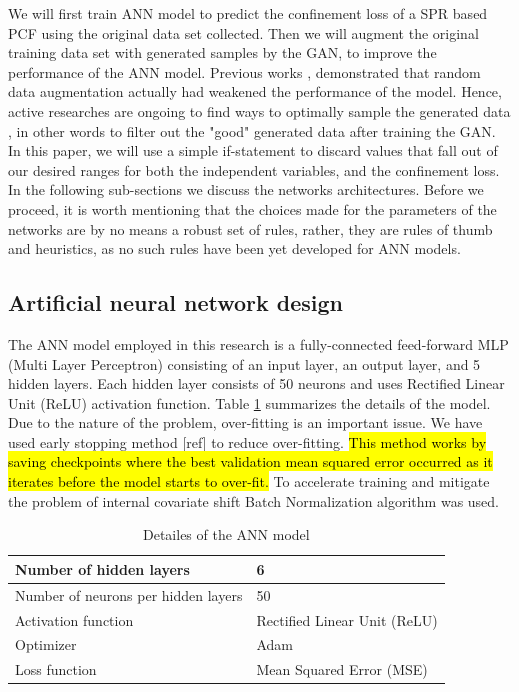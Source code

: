 \documentclass[draft, 10pt]{IEEEtran}
\begin{document}
We will first train ANN model to predict the confinement loss of a SPR based PCF using the original data set collected. Then we will augment the original training data set with generated samples by the GAN, to improve the performance of the ANN model.
Previous works \cite{ravuri2019seeing, shmelkov2018good}, demonstrated that random data augmentation actually had weakened the performance of the model. Hence, active researches are ongoing to find ways to optimally sample the generated data \cite{bhattarai2019sampling}, in other words to filter out the "good" generated data after training the GAN. In this paper, we will use a simple if-statement to discard values that fall out of our desired ranges for both the independent variables, and the confinement loss. In the following sub-sections we discuss the networks architectures. Before we proceed, it is worth mentioning that the choices made for the parameters of the networks are by no means a robust set of rules, rather, they are rules of thumb and heuristics, as no such rules have been yet developed for ANN models.

\subsection{Artificial neural network design}
\label{ssec:ann}
The ANN model employed in this research is a fully-connected feed-forward MLP (Multi Layer Perceptron) consisting of an input layer, an output layer, and 5 hidden layers. Each hidden layer consists of 50 neurons and uses Rectified Linear Unit (ReLU) activation function.  Table \ref{tbl:anndetails} summarizes the details of the model. Due to the nature of the problem, over-fitting is an important issue. We have used early stopping method [ref] to reduce over-fitting. \hl{This method works by saving checkpoints where the best validation mean squared error occurred as it iterates before the model starts to over-fit.} To accelerate training and mitigate the problem of internal covariate shift Batch Normalization algorithm \cite{ioffe2015batch} was used.

\begin{table}[h]
\centering
    \begin{tabular}{|l|l|}
    \hline
Number of hidden layers & 6  \\
\hline
Number of neurons per hidden layers & 50  \\
\hline
Activation function & Rectified Linear Unit (ReLU)  \\
\hline
Optimizer & Adam\cite{kingma2014adam}  \\
\hline
Loss function& Mean Squared Error (MSE) \\
\hline
    \end{tabular}
\caption{Detailes of the ANN model}
\label{tbl:anndetails}
\end{table}
\end{document}
